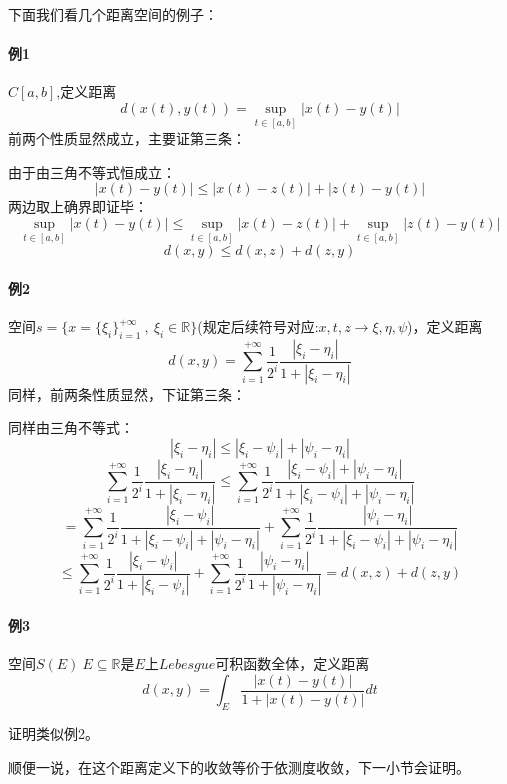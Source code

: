 下面我们看几个距离空间的例子：
\paragraph*{例1} \quad $C[a,b]$,定义距离
\[d(x(t),y(t))=\mathop{\text{sup}}\limits_{t \in [a,b]}\left|x(t)-y(t)\right|\]
前两个性质显然成立，主要证第三条：

由于由三角不等式恒成立：
\[\left|x(t)-y(t)\right| \leq \left|x(t)-z(t)\right|+\left|z(t)-y(t)\right|\]
两边取上确界即证毕：
\[\mathop{\text{sup}}\limits_{t \in [a,b]}\left|x(t)-y(t)\right| \leq \mathop{\text{sup}}\limits_{t \in [a,b]}\left|x(t)-z(t)\right|+\mathop{\text{sup}}\limits_{t \in [a,b]}\left|z(t)-y(t)\right|\]
\[d(x,y) \leq d(x,z)+d(z,y)\]

\paragraph*{例2} \quad 空间$s=\{x=\{\xi_i\}_{i=1}^{+\infty} \ , \ \xi_i \in \mathbb{R}\}$(规定后续符号对应:$x,t,z \rightarrow \xi,\eta,\psi$)，定义距离
\[d(x,y)=\sum_{i=1}^{+\infty}\frac{1}{2^i}\frac{|\xi_i-\eta_i|}{1+|\xi_i-\eta_i|}\]
同样，前两条性质显然，下证第三条：

同样由三角不等式：
\[\left|\xi_i-\eta_i\right| \leq \left|\xi_i-\psi_i\right|+\left|\psi_i-\eta_i\right|\]
\[\sum_{i=1}^{+\infty}\frac{1}{2^i}\frac{|\xi_i-\eta_i|}{1+|\xi_i-\eta_i|} \leq \sum_{i=1}^{+\infty}\frac{1}{2^i}\frac{\left|\xi_i-\psi_i\right|+\left|\psi_i-\eta_i\right|}{1+\left|\xi_i-\psi_i\right|+\left|\psi_i-\eta_i\right|}\]
\[=\sum_{i=1}^{+\infty}\frac{1}{2^i}\frac{\left|\xi_i-\psi_i\right|}{1+\left|\xi_i-\psi_i\right|+\left|\psi_i-\eta_i\right|}+\sum_{i=1}^{+\infty}\frac{1}{2^i}\frac{\left|\psi_i-\eta_i\right|}{1+\left|\xi_i-\psi_i\right|+\left|\psi_i-\eta_i\right|}\]
\[\leq \sum_{i=1}^{+\infty}\frac{1}{2^i}\frac{\left|\xi_i-\psi_i\right|}{1+\left|\xi_i-\psi_i\right|}+\sum_{i=1}^{+\infty}\frac{1}{2^i}\frac{\left|\psi_i-\eta_i\right|}{1+\left|\psi_i-\eta_i\right|}=d(x,z)+d(z,y)\]

\paragraph*{例3} \quad 空间$S(E) \ E \subseteq \mathbb{R}$是$E$上$Lebesgue$可积函数全体，定义距离
\[d(x,y)=\int_E\frac{\left|x(t)-y(t)\right|}{1+\left|x(t)-y(t)\right|}dt\]

证明类似例2。

顺便一说，在这个距离定义下的收敛等价于依测度收敛，下一小节会证明。

